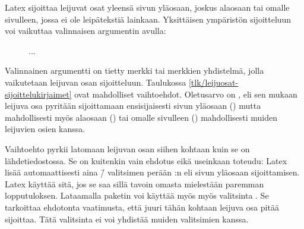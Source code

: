 Latex sijoittaa leijuvat osat yleensä sivun yläosaan, joskus alaosaan
tai omalle sivulleen, jossa ei ole leipätekstiä lainkaan. Yksittäisen
ympäristön sijoitteluun voi vaikuttaa valinnaisen argumentin avulla:

\begin{koodilohkosis}
\begin{figure}[sijainti]
  ...
\end{figure}
\end{koodilohkosis}


\noindent
Valinnainen argumentti  on tietty merkki tai merkkien
yhdistelmä, jolla vaikutetaan leijuvan osan sijoitteluun. Taulukossa
\ref{tlk/leijuosat-sijoittelukirjaimet} ovat mahdolliset vaihtoehdot.
Oletusarvo on , eli sen mukaan leijuva osa pyritään
sijoittamaan ensisijaisesti sivun yläosaan () mutta
mahdollisesti myös alaosaan () tai omalle sivulleen ()
mahdollisesti muiden leijuvien osien kanssa.

Vaihtoehto  pyrkii latomaan leijuvan osan siihen kohtaan kuin
se on lähdetiedostossa. Se on kuitenkin vain ehdotus eikä useinkaan
toteudu: Latex lisää automaattisesti aina \=/ valitsimen perään
:n eli sivun yläosaan sijoittamisen. Latex käyttää sitä, jos se
saa sillä tavoin omasta mielestään paremman lopputuloksen. Lataamalla
paketin  voi käyttää myös myös valitsinta .
Se tarkoittaa ehdotonta vaatimusta, että juuri tähän kohtaan leijuva osa
pitää sijoittaa. Tätä valitsinta ei voi yhdistää muiden valitsimien
kanssa.

